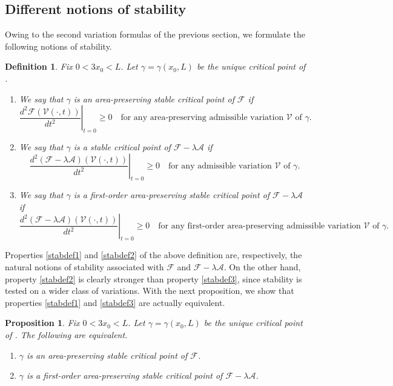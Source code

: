 \documentclass[11pt]{amsart}
\renewcommand{\geq}{\geqslant}
\newcommand{\A}{\mathcal A}
\newcommand{\F}{\mathcal F}
\newtheorem{proposition}[theorem]{Proposition}
\newtheorem{definition}[theorem]{Definition}
\theoremstyle{definition}
\theoremstyle{remark}
\numberwithin{equation}{section}
\begin{document}
\subsection{Different notions of stability}\label{sec_difnotstab}
Owing to the second variation formulas of the previous section, we formulate the following notions of stability.
\begin{definition}\label{stabilitydefinition}
Fix $0<3x_0<L$. Let $\gamma=\gamma(x_0,L)$ be the unique critical point of .

\begin{enumerate}
	\item [(i)] We say that $\gamma$ is an \emph{area-preserving stable critical point} of $\F$ if
	\begin{equation}\label{stabdef1}
		\left.\frac{d^2\F(\mathcal V(\cdot,t))}{dt^2}\right|_{t=0}\geq 0\quad\text{for any area-preserving admissible variation $\mathcal V$ of $\gamma$.}
	\end{equation}
	
	\item [(ii)]We say that $\gamma$ is a \emph{stable critical point} of $\F-\lambda\A$ if
	\begin{equation}\label{stabdef2}
		\left.\frac{d^2(\F-\lambda\A)(\mathcal V(\cdot,t))}{dt^2}\right|_{t=0}\geq 0\quad\text{for any admissible variation $\mathcal V$ of $\gamma$.}
	\end{equation}
	
	\item [(iii)] We say that $\gamma$ is a \emph{first-order area-preserving stable critical point} of $\F-\lambda\A$ if
	\begin{equation}\label{stabdef3}
		\left.\frac{d^2(\F-\lambda\A)(\mathcal V(\cdot,t))}{dt^2}\right|_{t=0}\geq 0\quad\text{for any first-order area-preserving admissible variation $\mathcal V$ of $\gamma$.}
	\end{equation}
	
\end{enumerate}
\end{definition}
Properties \eqref{stabdef1} and \eqref{stabdef2} of the above definition are, respectively, the natural notions of stability associated with $\F$ and $\F-\lambda\A$. On the other hand, property \eqref{stabdef2} is clearly stronger than property \eqref{stabdef3}, since stability is tested on a wider class of variations. With the next proposition, we show that properties \eqref{stabdef1} and \eqref{stabdef3} are actually equivalent.
\begin{proposition}\label{stabilityequivalent}
Fix $0<3x_0<L$. Let $\gamma=\gamma(x_0,L)$ be the unique critical point of . The following are equivalent. 
\begin{enumerate}
	\item [(i)] $\gamma$ is an area-preserving stable critical point of $\F$.
	\item [(ii)] $\gamma$ is a first-order area-preserving stable critical point of $\F-\lambda\A$.
\end{enumerate}
\end{proposition}
\end{document}
